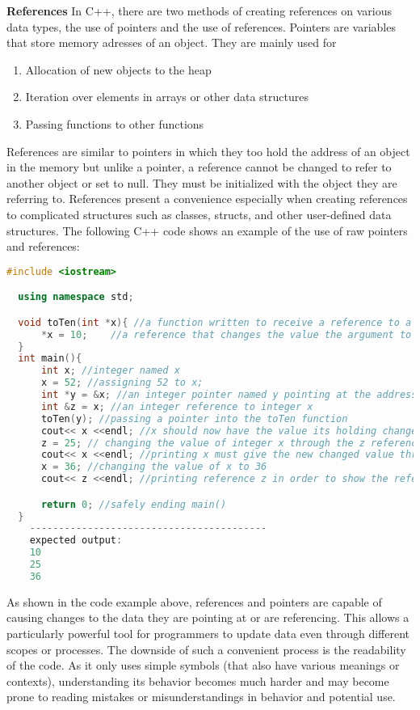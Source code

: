 \documentclass[12pt]{article}
\begin{document}
\textbf{References} In C++, there are two methods of creating references on various data types, the use of pointers and the use of references. Pointers are variables that store memory adresses of an object. They are mainly used for
\begin{enumerate}
  \item Allocation of new objects to the heap
  \item Iteration over elements in arrays or other data structures
  \item Passing functions to other functions
\end{enumerate}
References are similar to pointers in which they too hold the address of an object in the memory but unlike a pointer, a reference cannot be changed to refer to another object or set to null. They must be initialized with the object they are referring to. References present a convenience especially when creating references to complicated structures such as classes, structs, and other user-defined data structures. The following C++ code shows an example of the use of raw pointers and references:

\begin{lstlisting}[language=C++]
  #include <iostream>

  using namespace std;

  void toTen(int *x){ //a function written to receive a reference to a variable
      *x = 10;    //a reference that changes the value the argument to 10
  }
  int main(){
      int x; //integer named x
      x = 52; //assigning 52 to x;
      int *y = &x; //an integer pointer named y pointing at the address of integer x
      int &z = x; //an integer reference to integer x
      toTen(y); //passing a pointer into the toTen function
      cout<< x <<endl; //x should now have the value its holding changed to 10
      z = 25; // changing the value of integer x through the z reference
      cout<< x <<endl; //printing x must give the new changed value through the reference
      x = 36; //changing the value of x to 36
      cout<< z <<endl; //printing reference z in order to show the referencing

      return 0; //safely ending main()
  }
    -----------------------------------------
    expected output:
    10
    25
    36
\end{lstlisting}

As shown in the code example above, references and pointers are capable of causing changes to the data they are pointing at or are referencing. This allows a particularly powerful tool for programmers to update data even through different scopes or processes. The downside of such a convenient process is the readability of the code. As it only uses simple symbols (that also have various meanings or contexts), understanding its behavior becomes much harder and may become prone to reading mistakes or misunderstandings in behavior and potential use. 
\end{document}
